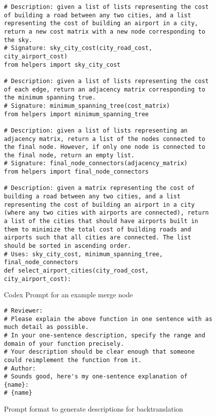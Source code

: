\begin{figure*}[h]
\begin{lstlisting}
# Description: given a list of lists representing the cost of building a road between any two cities, and a list representing the cost of building an airport in a city, return a new cost matrix with a new node corresponding to the sky.
# Signature: sky_city_cost(city_road_cost, city_airport_cost)
from helpers import sky_city_cost

# Description: given a list of lists representing the cost of each edge, return an adjacency matrix corresponding to the minimum spanning true.
# Signature: minimum_spanning_tree(cost_matrix)
from helpers import minimum_spanning_tree

# Description: given a list of lists representing an adjacency matrix, return a list of the nodes connected to the final node. However, if only one node is connected to the final node, return an empty list.
# Signature: final_node_connectors(adjacency_matrix)
from helpers import final_node_connectors

# Description: given a matrix representing the cost of building a road between any two cities, and a list representing the cost of building an airport in a city (where any two cities with airports are connected), return a list of the cities that should have airports built in them to minimize the total cost of building roads and airports such that all cities are connected. The list should be sorted in ascending order.
# Uses: sky_city_cost, minimum_spanning_tree, final_node_connectors
def select_airport_cities(city_road_cost, city_airport_cost):
\end{lstlisting}
\caption{Codex Prompt for an example merge node}
\end{figure*}

\begin{figure*}[h]
\begin{lstlisting}
# Reviewer:
# Please explain the above function in one sentence with as much detail as possible.
# In your one-sentence description, specify the range and domain of your function precisely.
# Your description should be clear enough that someone could reimplement the function from it.
# Author:
# Sounds good, here's my one-sentence explanation of {name}:
# {name}
\end{lstlisting}
\caption{Prompt format to generate descriptions for backtranslation}
\end{figure*}

\clearpage
\newpage

